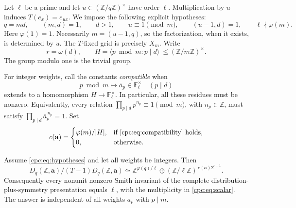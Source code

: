 Let $\ell$ be a prime and let $u\in(\mathbb Z/q\mathbb Z)^\times$
have order $\ell$. Multiplication by $u$ induces
$T(e_x)=e_{ux}$. We impose the following explicit hypotheses:
\begin{equation}\label{cpc:eq:hypotheses}
 q=md,\qquad (m,d)=1,\qquad d>1,\qquad
 u\equiv1\pmod m,\qquad (u-1,d)=1,\qquad
 \ell\nmid\varphi(m).
\end{equation}
Here $\varphi(1)=1$. Necessarily $m=(u-1,q)$, so the factorization,
when it exists, is determined by $u$. The $T$-fixed grid is precisely
$X_m$. Write
\begin{equation}\label{cpc:eq:parameters}
 r=\omega(d),\qquad
 H=\langle p\bmod m:p\mid d\rangle
       \ \le (\mathbb Z/m\mathbb Z)^\times.
\end{equation}
The group modulo one is the trivial group.

For integer weights, call the constants \emph{compatible} when
\begin{equation}\label{cpc:eq:compatibility}
 p\bmod m\longmapsto \overline a_p\in\mathbb F_\ell^\times
 \quad(p\mid d)
\end{equation}
extends to a homomorphism $H\to\mathbb F_\ell^\times$.
In particular, all these residues must be nonzero. Equivalently,
every relation $\prod_{p\mid d}p^{n_p}\equiv1\pmod m$, with
$n_p\in\mathbb Z$, must satisfy
$\prod_{p\mid d}\overline a_p^{\,n_p}=1$.
Set
\begin{equation}\label{cpc:eq:multiplicity}
 c(\mathbf a)=
 \begin{cases}
 \varphi(m)/|H|,&\text{if \eqref{cpc:eq:compatibility} holds},\\
 0,&\text{otherwise}.
 \end{cases}
\end{equation}

\begin{theorem}
\label{cpc:thm:scalar}
Assume \eqref{cpc:eq:hypotheses} and let all weights be integers.
Then
\begin{equation}\label{cpc:eq:scalar}
 \boxed{\displaystyle
 D_q(\mathbb Z,\mathbf a)/(T-1)D_q(\mathbb Z,\mathbf a)
 \simeq \mathbb Z^{\varphi(q)/\ell}
       \oplus (\mathbb Z/\ell\mathbb Z)^{\,c(\mathbf a)2^{r-1}}.}
\end{equation}
Consequently every nonunit nonzero Smith invariant of the complete
distribution-plus-symmetry presentation equals $\ell$, with the
multiplicity in \eqref{cpc:eq:scalar}. The answer is independent of
all weights $a_p$ with $p\mid m$.
\end{theorem}

